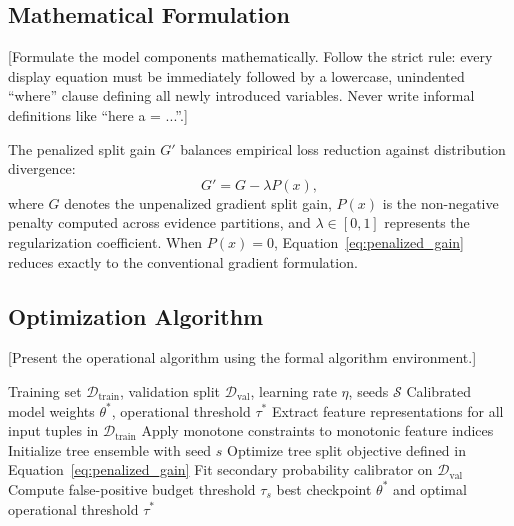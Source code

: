 \documentclass[a4paper,fleqn]{cas-sc}
\begin{document}
\subsection{Mathematical Formulation}
[Formulate the model components mathematically. Follow the strict rule: every display equation must be immediately followed by a lowercase, unindented ``where'' clause defining all newly introduced variables. Never write informal definitions like ``here a = ...''.]

The penalized split gain $G'$ balances empirical loss reduction against distribution divergence:
\begin{equation}
  G' = G - \lambda P(x), \label{eq:penalized_gain}
\end{equation}
where $G$ denotes the unpenalized gradient split gain, $P(x)$ is the non-negative penalty computed across evidence partitions, and $\lambda \in [0, 1]$ represents the regularization coefficient. When $P(x) = 0$, Equation~\eqref{eq:penalized_gain} reduces exactly to the conventional gradient formulation.

\subsection{Optimization Algorithm}
[Present the operational algorithm using the formal algorithm environment.]

\begin{algorithm}[H]
  \caption{Proposed model training and threshold calibration procedure}
  \label{alg:training}
  \begin{algorithmic}[1]
    \Require Training set $\mathcal{D}_{\text{train}}$, validation split $\mathcal{D}_{\text{val}}$, learning rate $\eta$, seeds $\mathcal{S}$
    \Ensure Calibrated model weights $\theta^*$, operational threshold $\tau^*$
    \State Extract feature representations for all input tuples in $\mathcal{D}_{\text{train}}$
    \State Apply monotone constraints to monotonic feature indices
      \State Initialize tree ensemble with seed $s$
      \State Optimize tree split objective defined in Equation~\eqref{eq:penalized_gain}
      \State Fit secondary probability calibrator on $\mathcal{D}_{\text{val}}$
      \State Compute false-positive budget threshold $\tau_s$
    \EndFor
    \State \Return best checkpoint $\theta^*$ and optimal operational threshold $\tau^*$
  \end{algorithmic}
\end{algorithm}
\end{document}
